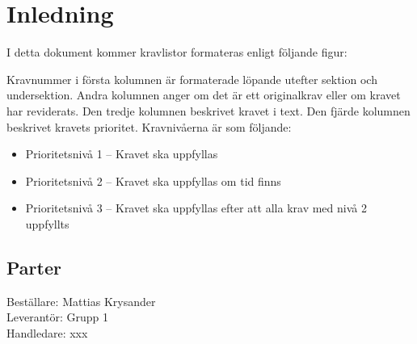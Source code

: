 \documentclass[a4paper,11pt]{article}
\begin{document}
\pagestyle{intro}
\LIPStitelsida
\clearpage
\begin{LIPSprojektidentitet}
\end{LIPSprojektidentitet}
\clearpage
\renewcommand{\familydefault}{\sfdefault}	%
\normalfont
\tableofcontents
\renewcommand{\familydefault}{\rmdefault}	%
\normalfont
\clearpage
\begin{LIPSdokumenthistorik}
\end{LIPSdokumenthistorik}
\clearpage
\setcounter{page}{1}
\pagestyle{content}
\section{Inledning}


I detta dokument kommer kravlistor formateras enligt följande figur: 

\begin{LIPSkravlista}
\end{LIPSkravlista}

Kravnummer i första kolumnen är formaterade löpande utefter sektion och undersektion. Andra kolumnen anger om det är ett originalkrav eller om kravet har reviderats. Den tredje kolumnen beskrivet kravet i text. Den fjärde kolumnen beskrivet kravets prioritet. Kravnivåerna är som följande:

\begin{itemize}
	\item Prioritetsnivå 1 – Kravet ska uppfyllas
	\item Prioritetsnivå 2 – Kravet ska uppfyllas om tid finns
	\item Prioritetsnivå 3 – Kravet ska uppfyllas efter att alla krav med nivå 2 uppfyllts 
\end{itemize}
\subsection{Parter}
Beställare: Mattias Krysander \\
Leverantör: Grupp 1 \\
Handledare: xxx 
\end{document}
